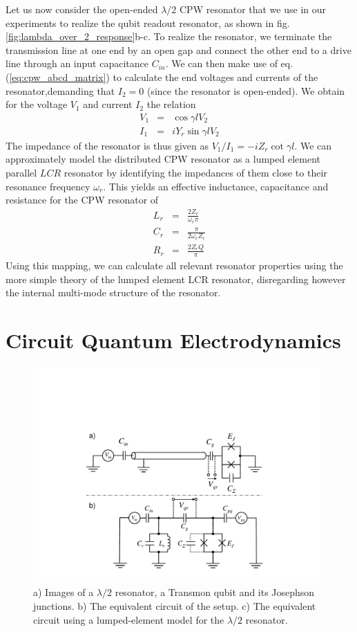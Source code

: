 Let us now consider the open-ended $\lambda / 2$ CPW resonator that we use in our experiments to realize the qubit readout resonator, as shown in fig. \ref{fig:lambda_over_2_response}b-c. To realize the resonator, we terminate the transmission line at one end by an open gap and connect the other end to a drive line through an input capacitance $C_{in}$. We can then make use of eq. (\ref{eq:cpw_abcd_matrix}) to calculate the end voltages and currents of the resonator,demanding that $I_2=0$ (since the resonator is open-ended). We obtain for the voltage $V_1$ and current $I_2$ the relation
%
\begin{eqnarray}
V_1 & = & \cos{\gamma l} V_2 \\
I_1 & = & i Y_r \sin{\gamma l} V_2
\end{eqnarray}
%
The impedance of the resonator is thus given as $V_1/I_1 = -i Z_r \cot{\gamma l}$. We can approximately model the distributed CPW resonator as a lumped element parallel $LCR$ resonator by identifying the impedances of them close to their resonance frequency $\omega_r$. This yields an effective inductance, capacitance and resistance for the CPW resonator of
%
\begin{eqnarray}
L_{r} & = & \frac{2 Z_r}{\omega_r \pi} \\
C_{r} & = & \frac{\pi}{2\omega_r Z_r} \\
R_{r} & = & \frac{2 Z_r Q}{\pi}
\end{eqnarray}
%
Using this mapping, we can calculate all relevant resonator properties using the more simple theory of the lumped element LCR resonator, disregarding however the internal multi-mode structure of the resonator.


\section{Circuit Quantum Electrodynamics}

\begin{figure}
	\includegraphics[width=11cm]{"./material/figures/introduction/cqed/cqed"}
	\caption{a) Images of a $\lambda/2$ resonator, a Transmon qubit and its Josephson junctions. b) The equivalent circuit of the setup. c) The equivalent circuit using a lumped-element model for the $\lambda/2$ resonator.}
	\label{fig:CQED}
\end{figure}


